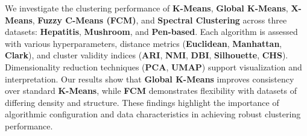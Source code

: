 We investigate the clustering performance of \textbf{K-Means}, \textbf{Global K-Means}, \textbf{X-Means}, \textbf{Fuzzy C-Means (FCM)}, and \textbf{Spectral Clustering} across three datasets: \textbf{Hepatitis}, \textbf{Mushroom}, and \textbf{Pen-based}. Each algorithm is assessed with various hyperparameters, distance metrics (\textbf{Euclidean}, \textbf{Manhattan}, \textbf{Clark}), and cluster validity indices (\textbf{ARI}, \textbf{NMI}, \textbf{DBI}, \textbf{Silhouette}, \textbf{CHS}). Dimensionality reduction techniques (\textbf{PCA}, \textbf{UMAP}) support visualization and interpretation. Our results show that \textbf{Global K-Means} improves consistency over standard \textbf{K-Means}, while \textbf{FCM} demonstrates flexibility with datasets of differing density and structure. These findings highlight the importance of algorithmic configuration and data characteristics in achieving robust clustering performance.